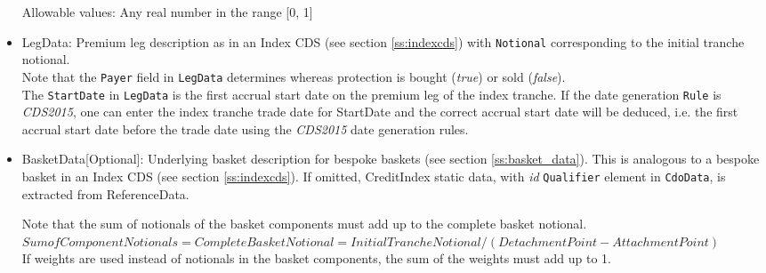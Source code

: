 \begin{itemize}
Allowable values: Any  real number in the range [0, 1]

\item LegData: Premium leg description as in an Index CDS (see section
  \ref{ss:indexcds}) with \lstinline!Notional! corresponding to the initial tranche notional. \\
  Note that the \lstinline!Payer! field in  \lstinline!LegData! determines whereas protection is bought (\emph{true}) or sold (\emph{false}). \\
  The \lstinline!StartDate! in  \lstinline!LegData!  is the first accrual start date on the premium leg of the index tranche. If the date generation \lstinline!Rule! is \emph{CDS2015}, one can enter the index tranche trade date for StartDate and the correct accrual start date will be deduced, i.e. the first accrual start date before the trade date using the \emph{CDS2015} date generation rules.
\item BasketData[Optional]: Underlying basket description for bespoke baskets (see section \ref{ss:basket_data}).  This is analogous to a bespoke basket in an Index CDS  (see section
  \ref{ss:indexcds}). If omitted, CreditIndex static data, with \emph{id} {\tt Qualifier} element in {\tt CdoData},
  is extracted from ReferenceData.
  
  Note that the sum of notionals of the basket components must add up to the complete basket notional. \\
  \medskip
  $
  Sum of Component Notionals = Complete Basket Notional = Initial Tranche Notional / (Detachment Point - Attachment Point)
  $
  \\  \medskip
  If weights are used instead of notionals in the basket components, the sum of the weights must add up to 1.
\end{itemize}
